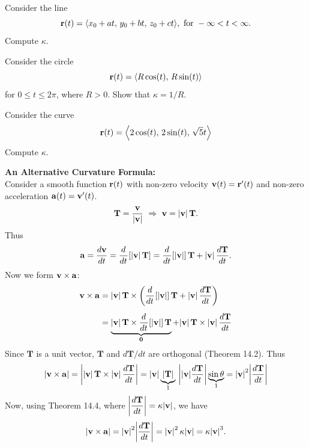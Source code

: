 \documentclass[mathNotesPreamble]{subfiles}
\begin{document}
  \begin{ex*}
    Consider the line
      \[{\mathbf{r}}(t)={\left\langle x_0+at,\,y_0+bt,\,z_0+ct \right\rangle},\textnormal{ for }-\infty<t<\infty.\]
    Compute $\kappa$.
  \end{ex*}

  \pagebreak

  \begin{ex*}
    Consider the circle
      \[{\mathbf{r}}(t)={\left\langle R\cos(t),\,R\sin(t) \right\rangle}\]
    for $0\leq t\leq 2\pi$, where $R>0$. Show that $\kappa=1/R$.
  \end{ex*}

  \begin{ex*}
    Consider the curve
      \[{\mathbf{r}}(t)={\left\langle 2\cos(t),\,2\sin(t),\,\sqrt{5}t \right\rangle}\]
    Compute $\kappa$.
  \end{ex*}

  \pagebreak
  \textbf{An Alternative Curvature Formula:}\\
  Consider a smooth function ${\mathbf{r}}(t)$ with non-zero velocity ${\mathbf{v}}(t)={\mathbf{r}}'(t)$ and non-zero acceleration $\mathbf a(t)={\mathbf{v}}'(t)$. 
    \[\mathbf T=\frac{\vecv}{\abs{\vecv}}\ \Rightarrow\   \vecv=\abs{\vecv}\,\mathbf T.\]
  Thus
    \[\mathbf a=\frac{d{\mathbf{v}}}{dt}={\frac{d^{}}{dt^{}}}{\left[{\left\vert{\mathbf{v}}\right\vert}\,\mathbf T\right]}={\frac{d^{}}{dt^{}}}{\left[{\left\vert{\mathbf{v}}\right\vert}\right]}\,\mathbf T+{\left\vert{\mathbf{v}}\right\vert}\,\frac{d\mathbf T}{dt}.\]
  Now we form ${\mathbf{v}}\times\mathbf a$:
  \begin{align*}
    {\mathbf{v}}\times\mathbf a&={\left\vert{\mathbf{v}}\right\vert}\,\mathbf T\times{\left({\frac{d^{}}{dt^{}}}{\left[{\left\vert{\mathbf{v}}\right\vert}\right]}\,\mathbf T+{\left\vert{\mathbf{v}}\right\vert}\,\frac{d\mathbf T}{dt}\right)}\\[5pt]
      &=\underbrace{{\left\vert{\mathbf{v}}\right\vert}\,\mathbf T\times{\frac{d^{}}{dt^{}}}{\left[{\left\vert{\mathbf{v}}\right\vert}\right]}\,\mathbf T}_{\mathbf{0}}+{\left\vert{\mathbf{v}}\right\vert}\,\mathbf T\times{\left\vert{\mathbf{v}}\right\vert}\,\frac{d\mathbf T}{dt}
  \end{align*}
  Since $\mathbf T$ is a unit vector, $\mathbf T$ and $d\mathbf T/dt$ are orthogonal (Theorem 14.2). Thus
  \begin{align*}
    {\left\vert{\mathbf{v}}\times\mathbf a\right\vert}={\left\vert{\left\vert{\mathbf{v}}\right\vert}\,\mathbf T\times{\left\vert{\mathbf{v}}\right\vert}\,\frac{d\mathbf T}{dt}\right\vert}={\left\vert{\mathbf{v}}\right\vert}\underbrace{{\left\vert\mathbf T\right\vert}}_1\,{\left\vert{\left\vert{\mathbf{v}}\right\vert}\frac{d\mathbf T}{dt}\right\vert}\underbrace{\sin\theta}_1
      ={\left\vert{\mathbf{v}}\right\vert}^2 {\left\vert\frac{d\mathbf T}{dt}\right\vert}
  \end{align*}
  Now, using Theorem 14.4, where $\displaystyle{\left\vert\frac{d\mathbf T}{dt}\right\vert}=\kappa {\left\vert{\mathbf{v}}\right\vert}$, we have
    \[{\left\vert{\mathbf{v}}\times\mathbf a\right\vert}={\left\vert{\mathbf{v}}\right\vert}^2{\left\vert\frac{d\mathbf T}{dt}\right\vert}={\left\vert{\mathbf{v}}\right\vert}^2\,\kappa{\left\vert{\mathbf{v}}\right\vert}=\kappa{\left\vert{\mathbf{v}}\right\vert}^3.\]
\end{document}
